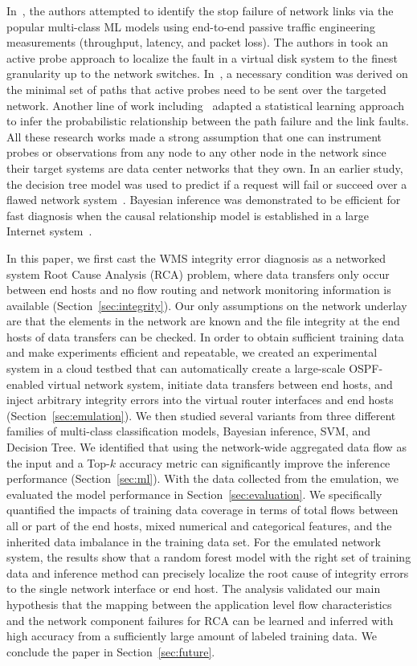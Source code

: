 In~\cite{Link-JIoT-2019}, the authors attempted to identify the stop failure of network links via the popular multi-class ML models using end-to-end passive traffic engineering measurements (throughput, latency, and packet loss). The authors in \cite{DeepView:NSDI18} took an active probe approach to localize the fault in a virtual disk system to the finest granularity up to the network switches. In~\cite{netbouncer:nsdi18}, a necessary condition was derived on the minimal set of paths that active probes need to be sent over the targeted network. Another line of work including~\cite{NetPoirot:Sigcomm2016,KDD14} adapted a statistical learning approach to infer the probabilistic relationship between the path failure and the link faults. All these research works made a strong assumption that one can instrument probes or observations from any node to any other node in the network since their target systems are data center networks that they own. In an earlier study, the decision tree model was used to predict if a request will fail or succeed over a flawed network system~\cite{DT:2004}. Bayesian inference was demonstrated to be efficient for fast diagnosis when the causal relationship model is established in a large Internet system~\cite{BN-Internet:2007}.

In this paper, we first cast the WMS integrity error diagnosis as a networked system Root Cause Analysis (RCA) problem, where data transfers only occur between end hosts and no flow routing and network monitoring information is available (Section~\ref{sec:integrity}). Our only assumptions on the network underlay are that the elements in the network are known and the file integrity at the end hosts of data transfers can be checked. In order to obtain sufficient training data and make experiments efficient and repeatable, we created an experimental system in a cloud testbed that can automatically create a large-scale OSPF-enabled virtual network system, initiate data transfers between end hosts, and inject arbitrary integrity errors into the virtual router interfaces and end hosts (Section~\ref{sec:emulation}). We then studied several variants from three different families of multi-class classification models, Bayesian inference, SVM, and Decision Tree. We identified that using the network-wide aggregated data flow as the input and a Top-$k$ accuracy metric can significantly improve the inference performance (Section~\ref{sec:ml}). With the data collected from the emulation, we evaluated the model performance in Section~\ref{sec:evaluation}. We specifically quantified the impacts of training data coverage in terms of total flows between all or part of the end hosts, mixed numerical and categorical features, and the inherited data imbalance in the training data set. For the emulated network system, the results show that a random forest model with the right set of training data and inference method can precisely localize the root cause of integrity errors to the single network interface or end host. The analysis validated our main hypothesis that the mapping between the application level flow characteristics and the network component failures for RCA can be learned and inferred with high accuracy from a sufficiently large amount of labeled training data. We conclude the paper in Section~\ref{sec:future}.
